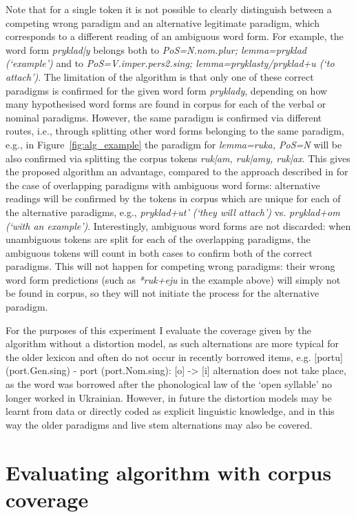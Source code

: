 \documentclass[11pt,a4paper]{article}
\begin{document}
Note that for a single token it is not possible to clearly distinguish between a competing wrong paradigm and an alternative legitimate paradigm, which corresponds to a different reading of an ambiguous word form. For example, the word form \emph{pryklad|y} belongs both to \emph{PoS=N.nom.plur; lemma=pryklad (`example')} and to \emph{PoS=V.imper.pers2.sing; lemma=pryklasty/pryklad+u (`to attach')}. The limitation of the algorithm is that only one of these correct paradigms is confirmed for the given word form \emph{pryklady}, depending on how many hypothesised word forms are found in corpus for each of the verbal or nominal paradigms. However, the same paradigm is confirmed via different routes, i.e., through splitting other word forms belonging to the same paradigm, e.g., in Figure~\ref{fig:alg_example} the paradigm for \emph{lemma=ruka, PoS=N} will be also confirmed via splitting the corpus tokens \emph{ruk|am, ruk|amy, ruk|ax}. This gives the proposed algorithm an advantage, compared to the approach described in \cite{ahlberg2015paradigm} for the case of overlapping paradigms with ambiguous word forms: alternative readings will be confirmed by the tokens in corpus which are unique for each of the alternative paradigms, e.g., \emph{pryklad+ut' (`they will attach')} vs. \emph{pryklad+om (`with an example')}. Interestingly, ambiguous word forms are not discarded: when unambiguous tokens are split for each of the overlapping paradigms, the ambiguous tokens will count in both cases to confirm both of the correct paradigms. This will not happen for competing wrong paradigms: their wrong word form predictions (such as \emph{*ruk+eju} in the example above)  will simply not be found in corpus, so they will not initiate the process for the alternative paradigm.

For the purposes of this experiment I evaluate the coverage given by the algorithm without a distortion model, as such alternations are more typical for the older lexicon and often do not occur in recently borrowed items, e.g. [portu] (port.Gen.sing) - port (port.Nom.sing): [o] -> [i] alternation does not take place, as the word was borrowed after the phonological law of the `open syllable' no longer worked in Ukrainian. However, in future the distortion models may be learnt from data or directly coded as explicit linguistic knowledge, and in this way the older paradigms and live stem alternations may also be covered.



\section{Evaluating algorithm with corpus coverage}
\label{sec:Evaluation}
\end{document}
